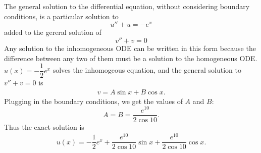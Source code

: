 \documentclass[11pt]{article}
\begin{document}
\subsection{}


\pagebreak
\section{}
\subsection{}

\subsection{}
The general solution to the differential equation, without considering boundary conditions, is a particular solution to 
\begin{equation}
u''+u=-e^x
\end{equation} 
added to the gereral solution of 
\begin{equation}
v''+v = 0
\end{equation} 
Any solution to the inhomogeneous ODE can be written in this form because the difference between any two of them must be a solution to the homogeneous ODE. $u(x)=-\dfrac12e^x$ solves the inhomogeous equation, and the general solution to $v''+v=0$ is 
\begin{equation}\begin{split}
v = A\sin x + B\cos x.
\end{split}\nonumber\end{equation} 
Plugging in the boundary conditions, we get the values of $A$ and $B$:
$$A =B=\dfrac{e^{10}}{2\cos 10}.$$
Thus the exact solution is 
\begin{equation}\begin{split}
u(x) = -\dfrac12e^x+\dfrac{e^{10}}{2\cos 10}\sin x +\dfrac{e^{10}}{2\cos 10}\cos x. 
\end{split}\end{equation} 

\pagebreak

\section{}
\subsection{}
\end{document}
